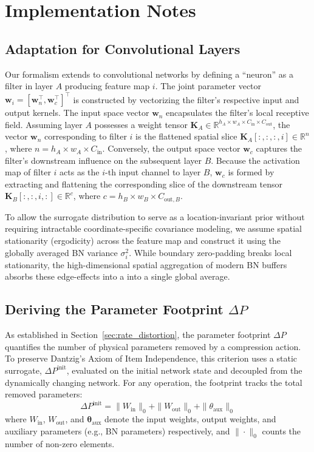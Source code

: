 \documentclass[11pt, a4paper, copyright, gdm]{google}
\newcommand{\wVect}{\boldsymbol{w}}
\newcommand{\thetaVect}{\boldsymbol{\theta}}
\newcommand{\R}{\mathbb{R}}
\newcommand{\Kmat}{\boldsymbol{K}}
\theoremstyle{definition}
\begin{document}
\section{Implementation Notes}


\subsection{Adaptation for Convolutional Layers}
\label{sec:conv_nets}
Our formalism extends to convolutional networks by defining a ``neuron'' as a filter in layer $A$ producing feature map $i$. The joint parameter vector $\wVect_i = [\wVect_n^\top, \wVect_c^\top]^\top$ is constructed by vectorizing the filter's respective input and output kernels. The input space vector $\wVect_n$ encapsulates the filter's local receptive field. Assuming layer $A$ possesses a weight tensor $\Kmat_A \in \R^{h_A \times w_A \times C_{\text{in}} \times C_{\text{out}}}$, the vector $\wVect_n$ corresponding to filter $i$ is the flattened spatial slice $\Kmat_A[:, :, :, i] \in \R^n$, where $n = h_A \times w_A \times C_{\text{in}}$. Conversely, the output space vector $\wVect_c$ captures the filter's downstream influence on the subsequent layer $B$. Because the activation map of filter $i$ acts as the $i$-th input channel to layer $B$, $\wVect_c$ is formed by extracting and flattening the corresponding slice of the downstream tensor $\Kmat_B[:, :, i, :] \in \R^c$, where $c = h_B \times w_B \times C_{\text{out}, B}$.

To allow the surrogate distribution to serve as a location-invariant prior without requiring intractable coordinate-specific covariance modeling, we assume spatial stationarity (ergodicity) across the feature map and construct it using the globally averaged BN variance $\sigma_i^2$. While boundary zero-padding breaks local stationarity, the high-dimensional spatial aggregation of modern BN buffers absorbs these edge-effects into a into a single global average.


\subsection{Deriving the Parameter Footprint $\Delta P$}
\label{sec:delta_P}

As established in Section~\ref{sec:rate_distortion}, the parameter footprint $\Delta P$ quantifies the number of physical parameters removed by a compression action. To preserve Dantzig's Axiom of Item Independence, this criterion uses a static surrogate, $\Delta P^{\text{init}}$, evaluated on the initial network state and decoupled from the dynamically changing network. For any operation, the footprint tracks the total removed parameters:
\begin{equation}
    \Delta P^{\text{init}} = \|W_{\text{in}}\|_0 + \|W_{\text{out}}\|_0 + \|\theta_{\text{aux}}\|_0
\end{equation}
where $W_{\text{in}}$, $W_{\text{out}}$, and $\thetaVect_{\text{aux}}$ denote the input weights, output weights, and auxiliary parameters (e.g., BN parameters)  respectively, and $\|\cdot\|_0$ counts the number of non-zero elements.
\end{document}
